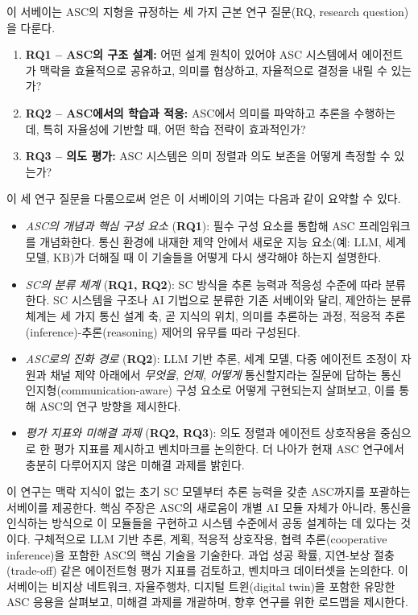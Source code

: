 이 서베이는 ASC의 지형을 규정하는 세 가지 근본 연구 질문(RQ, research question)을 다룬다.
\begin{enumerate}[label=\arabic*)]
\item \textbf{RQ1 -- ASC의 구조 설계:} 어떤 설계 원칙이 있어야 ASC 시스템에서 에이전트가 맥락을 효율적으로 공유하고, 의미를 협상하고, 자율적으로 결정을 내릴 수 있는가?
\item \textbf{RQ2 -- ASC에서의 학습과 적응:} ASC에서 의미를 파악하고 추론을 수행하는 데, 특히 자율성에 기반할 때, 어떤 학습 전략이 효과적인가?
\item \textbf{RQ3 -- 의도 평가:} ASC 시스템은 의미 정렬과 의도 보존을 어떻게 측정할 수 있는가?
\end{enumerate}

이 세 연구 질문을 다룸으로써 얻은 이 서베이의 기여는 다음과 같이 요약할 수 있다.
\begin{itemize}
\item \emph{ASC의 개념과 핵심 구성 요소} (\textbf{RQ1}): 필수 구성 요소를 통합해 ASC 프레임워크를 개념화한다. 통신 환경에 내재한 제약 안에서 새로운 지능 요소(예: LLM, 세계 모델, KB)가 더해질 때 이 기술들을 어떻게 다시 생각해야 하는지 설명한다.
\item \emph{SC의 분류 체계} (\textbf{RQ1, RQ2}): SC 방식을 추론 능력과 적응성 수준에 따라 분류한다. SC 시스템을 구조나 AI 기법으로 분류한 기존 서베이와 달리, 제안하는 분류 체계는 세 가지 통신 설계 축, 곧 지식의 위치, 의미를 추론하는 과정, 적응적 추론(inference)-추론(reasoning) 제어의 유무를 따라 구성된다.
\item \emph{ASC로의 진화 경로} (\textbf{RQ2}): LLM 기반 추론, 세계 모델, 다중 에이전트 조정이 자원과 채널 제약 아래에서 \emph{무엇을}, \emph{언제}, \emph{어떻게} 통신할지라는 질문에 답하는 통신 인지형(communication-aware) 구성 요소로 어떻게 구현되는지 살펴보고, 이를 통해 ASC의 연구 방향을 제시한다.
\item \emph{평가 지표와 미해결 과제} (\textbf{RQ2, RQ3}): 의도 정렬과 에이전트 상호작용을 중심으로 한 평가 지표를 제시하고 벤치마크를 논의한다. 더 나아가 현재 ASC 연구에서 충분히 다루어지지 않은 미해결 과제를 밝힌다.
\end{itemize}

이 연구는 맥락 지식이 없는 초기 SC 모델부터 추론 능력을 갖춘 ASC까지를 포괄하는 서베이를 제공한다. 핵심 주장은 ASC의 새로움이 개별 AI 모듈 자체가 아니라, 통신을 인식하는 방식으로 이 모듈들을 구현하고 시스템 수준에서 공동 설계하는 데 있다는 것이다. 구체적으로 LLM 기반 추론, 계획, 적응적 상호작용, 협력 추론(cooperative inference)을 포함한 ASC의 핵심 기술을 기술한다. 과업 성공 확률, 지연-보상 절충(trade-off) 같은 에이전트형 평가 지표를 검토하고, 벤치마크 데이터셋을 논의한다. 이 서베이는 비지상 네트워크, 자율주행차, 디지털 트윈(digital twin)을 포함한 유망한 ASC 응용을 살펴보고, 미해결 과제를 개괄하며, 향후 연구를 위한 로드맵을 제시한다.

